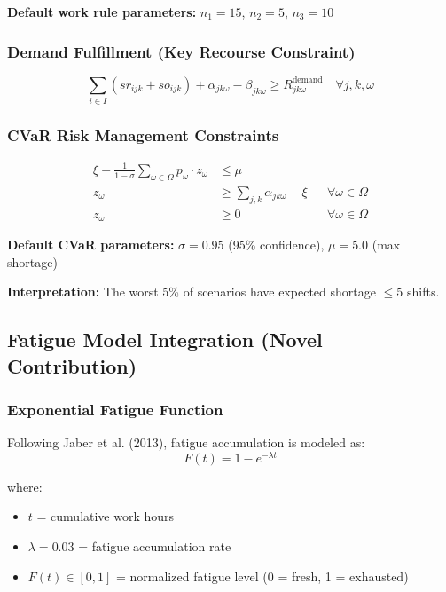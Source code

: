 \documentclass[11pt,letterpaper]{article}
\begin{document}
\textbf{Default work rule parameters:} $n_1 = 15$, $n_2 = 5$, $n_3 = 10$

\subsubsection{Demand Fulfillment (Key Recourse Constraint)}
\begin{equation}
\sum_{i \in I} (sr_{ijk} + so_{ijk}) + \alpha_{jk\omega} - \beta_{jk\omega} \geq R_{jk\omega}^{\text{demand}} \quad \forall j, k, \omega \tag{C16}
\end{equation}

\subsubsection{CVaR Risk Management Constraints}
\begin{align}
\xi + \frac{1}{1-\sigma} \sum_{\omega \in \Omega} p_\omega \cdot z_\omega &\leq \mu \tag{C19: CVaR limit} \\
z_\omega &\geq \sum_{j,k} \alpha_{jk\omega} - \xi && \forall \omega \in \Omega \tag{C20-21: VaR/excess} \\
z_\omega &\geq 0 && \forall \omega \in \Omega \tag{C22: Non-negativity}
\end{align}

\textbf{Default CVaR parameters:} $\sigma = 0.95$ (95\% confidence), $\mu = 5.0$ (max shortage)

\textbf{Interpretation:} The worst 5\% of scenarios have expected shortage $\leq 5$ shifts.

\subsection{Fatigue Model Integration (Novel Contribution)}

\subsubsection{Exponential Fatigue Function}
Following Jaber et al. (2013), fatigue accumulation is modeled as:
\begin{equation}
F(t) = 1 - e^{-\lambda t}
\end{equation}

where:
\begin{itemize}[leftmargin=*]
    \item $t$ = cumulative work hours
    \item $\lambda = 0.03$ = fatigue accumulation rate
    \item $F(t) \in [0, 1]$ = normalized fatigue level (0 = fresh, 1 = exhausted)
\end{itemize}
\end{document}
